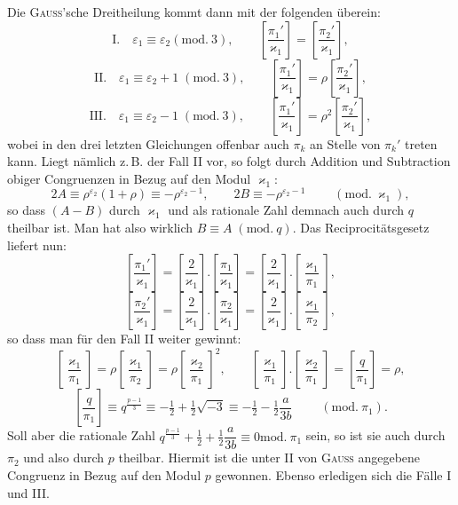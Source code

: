 \noindent Die \textsc{Gauss}'sche Dreitheilung kommt dann mit der folgenden überein:
\[
\text{I.}\quad \varepsilon_1\equiv \varepsilon_2 (\mathrm{mod.}\ 3),\qquad \left[\dfrac{\pi_1'}{\varkappa_1}\right]=\left[\dfrac{\pi_2'}{\varkappa_1}\right],
\]
\[
\text{II.}\quad \varepsilon_1\equiv \varepsilon_2+1\;(\mathrm{mod.}\ 3),\qquad \left[\dfrac{\pi_1'}{\varkappa_1}\right]=\rho\left[\dfrac{\pi_2'}{\varkappa_1}\right],
\]
\[
\text{III.}\quad \varepsilon_1\equiv \varepsilon_2-1\;(\mathrm{mod.}\ 3),\qquad \left[\dfrac{\pi_1'}{\varkappa_1}\right]=\rho^2\left[\dfrac{\pi_2'}{\varkappa_1}\right],
\]
wobei in den drei letzten Gleichungen offenbar auch $\pi_k$ an Stelle von $\pi_k'$ treten kann. Liegt nämlich z.\,B.
der Fall II vor, so folgt durch Addition und Subtraction obiger Congruenzen in Bezug auf den Modul $\varkappa_1$:
\[
2A\equiv \rho^{\varepsilon_2}(1+\rho)\equiv -\rho^{\varepsilon_2-1},\qquad 2B\equiv -\rho^{\varepsilon_2-1}\qquad\;(\mathrm{mod.}\ \varkappa_1),
\]
so dass $(A-B)$ durch $\varkappa_1$ und als rationale Zahl demnach auch durch $q$ theilbar ist. Man hat also wirklich $B\equiv A\;(\mathrm{mod.}\ q)$. Das Reciprocitätsgesetz liefert nun:
\[
\left[\dfrac{\pi_1'}{\varkappa_1}\right]=\left[\dfrac{2}{\varkappa_1}\right].\left[\dfrac{\pi_1}{\varkappa_1}\right]=\left[\dfrac{2}{\varkappa_1}\right].\left[\dfrac{\varkappa_1}{\pi_1}\right],
\]
\[
\left[\dfrac{\pi_2'}{\varkappa_1}\right]=\left[\dfrac{2}{\varkappa_1}\right].\left[\dfrac{\pi_2}{\varkappa_1}\right]=\left[\dfrac{2}{\varkappa_1}\right].\left[\dfrac{\varkappa_1}{\pi_2}\right],
\]
so dass man für den Fall II weiter gewinnt:
\[
\left[\dfrac{\varkappa_1}{\pi_1}\right]=\rho\left[\dfrac{\varkappa_1}{\pi_2}\right]=\rho\left[\dfrac{\varkappa_2}{\pi_1}\right]^2,\qquad
\left[\dfrac{\varkappa_1}{\pi_1}\right].\left[\dfrac{\varkappa_2}{\pi_1}\right]=\left[\dfrac{q}{\pi_1}\right]=\rho,
\]
\[
\left[\dfrac{q}{\pi_1}\right]\equiv q^{\frac{p-1}{3}}\equiv -\tfrac12+\tfrac12\sqrt{-3}\equiv -\tfrac12-\tfrac12\dfrac{a}{3b}\qquad\;(\mathrm{mod.}\ \pi_1).
\]
Soll aber die rationale Zahl $q^{\frac{p-1}{3}}+\tfrac12+\tfrac12\dfrac{a}{3b}\equiv 0 \mathrm{mod.}\ \pi_1$ sein, so ist sie auch durch $\pi_2$ und also durch $p$
theilbar. Hiermit ist die unter II von \textsc{Gauss} angegebene Congruenz in Bezug auf den Modul $p$ gewonnen.
Ebenso erledigen sich die Fälle I und III.
